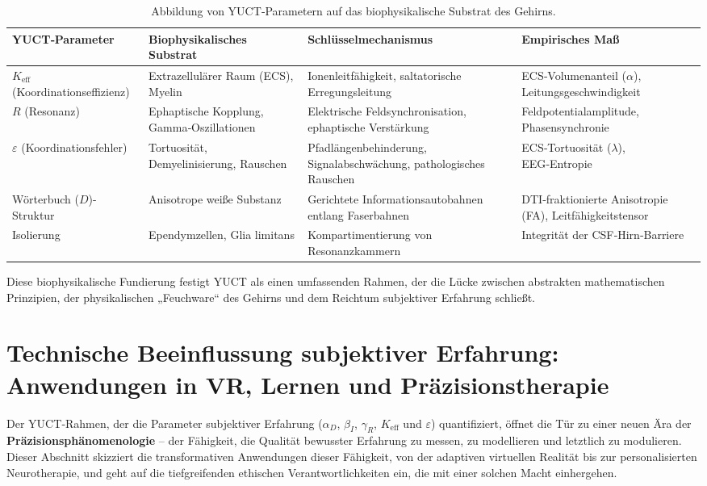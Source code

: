 \documentclass[12pt,a4paper]{article}
\begin{document}
	\begin{table}[H]
		\centering
		\caption{Abbildung von YUCT‑Parametern auf das biophysikalische Substrat des Gehirns.}
		\label{tab:biophysical-mapping}
		\small
		\begin{tabular}{p{3cm} p{4cm} p{5cm} p{3cm}}
			\toprule
			\textbf{YUCT‑Parameter} & \textbf{Biophysikalisches Substrat} & \textbf{Schlüsselmechanismus} & \textbf{Empirisches Maß} \\
			\midrule
			\(K_{\mathrm{eff}}\) (Koordinationseffizienz) & Extrazellulärer Raum (ECS), Myelin & Ionenleitfähigkeit, saltatorische Erregungsleitung & ECS‑Volumenanteil (\(\alpha\)), Leitungsgeschwindigkeit \\
			\(R\) (Resonanz) & Ephaptische Kopplung, Gamma‑Oszillationen & Elektrische Feldsynchronisation, ephaptische Verstärkung & Feldpotentialamplitude, Phasensynchronie \\
			\(\varepsilon\) (Koordinationsfehler) & Tortuosität, Demyelinisierung, Rauschen & Pfadlängenbehinderung, Signalabschwächung, pathologisches Rauschen & ECS‑Tortuosität (\(\lambda\)), EEG‑Entropie \\
			Wörterbuch (\(D\))-Struktur & Anisotrope weiße Substanz & Gerichtete Informationsautobahnen entlang Faserbahnen & DTI‑fraktionierte Anisotropie (FA), Leitfähigkeitstensor \\
			Isolierung & Ependymzellen, Glia limitans & Kompartimentierung von Resonanzkammern & Integrität der CSF‑Hirn‑Barriere \\
			\bottomrule
		\end{tabular}
	\end{table}
	
	Diese biophysikalische Fundierung festigt YUCT als einen umfassenden Rahmen, der die Lücke zwischen abstrakten mathematischen Prinzipien, der physikalischen „Feuchware“ des Gehirns und dem Reichtum subjektiver Erfahrung schließt.
	
	\section{Technische Beeinflussung subjektiver Erfahrung: Anwendungen in VR, Lernen und Präzisionstherapie}
	
	Der YUCT‑Rahmen, der die Parameter subjektiver Erfahrung (\(\alpha_D\), \(\beta_I\), \(\gamma_R\), \(K_{\mathrm{eff}}\) und \(\varepsilon\)) quantifiziert, öffnet die Tür zu einer neuen Ära der \textbf{Präzisionsphänomenologie} – der Fähigkeit, die Qualität bewusster Erfahrung zu messen, zu modellieren und letztlich zu modulieren. Dieser Abschnitt skizziert die transformativen Anwendungen dieser Fähigkeit, von der adaptiven virtuellen Realität bis zur personalisierten Neurotherapie, und geht auf die tiefgreifenden ethischen Verantwortlichkeiten ein, die mit einer solchen Macht einhergehen.
	
\end{document}
